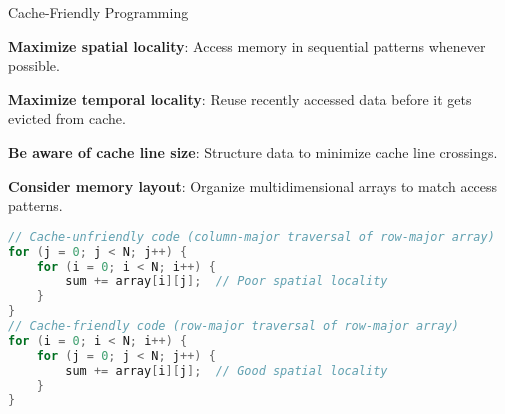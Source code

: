 \begin{KR}{Cache-Friendly Programming}

\textbf{Maximize spatial locality}:
Access memory in sequential patterns whenever possible.

\textbf{Maximize temporal locality}:
Reuse recently accessed data before it gets evicted from cache.

\textbf{Be aware of cache line size}:
Structure data to minimize cache line crossings.

\textbf{Consider memory layout}:
Organize multidimensional arrays to match access patterns.

\begin{lstlisting}[language=C, style=basesmol]
// Cache-unfriendly code (column-major traversal of row-major array)
for (j = 0; j < N; j++) {
    for (i = 0; i < N; i++) {
        sum += array[i][j];  // Poor spatial locality
    }
}
// Cache-friendly code (row-major traversal of row-major array)
for (i = 0; i < N; i++) {
    for (j = 0; j < N; j++) {
        sum += array[i][j];  // Good spatial locality
    }
}
\end{lstlisting}
\end{KR}


